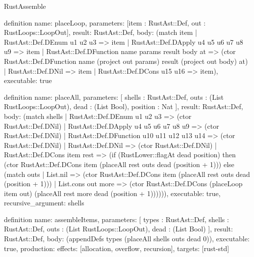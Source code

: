 \begin{lexlean}{RustAssemble}
\begin{semanticmodule}
definition{
  name: placeLoop,
  parameters: [item : RustAst::Def, out : RustLoops::LoopOut],
  result: RustAst::Def,
  body: (match item
    | RustAst::Def.DEnum u1 u2 u3 => item
    | RustAst::Def.DApply u4 u5 u6 u7 u8 u9 => item
    | RustAst::Def.DFunction name params result body at => (ctor RustAst::Def.DFunction name (project out params) result (project out body) at)
    | RustAst::Def.DNil => item
    | RustAst::Def.DCons u15 u16 => item),
  executable: true
}

definition{
  name: placeAll,
  parameters: [
    shells : RustAst::Def,
    outs : (List RustLoops::LoopOut),
    dead : (List Bool),
    position : Nat
  ],
  result: RustAst::Def,
  body: (match shells
    | RustAst::Def.DEnum u1 u2 u3 => (ctor RustAst::Def.DNil)
    | RustAst::Def.DApply u4 u5 u6 u7 u8 u9 => (ctor RustAst::Def.DNil)
    | RustAst::Def.DFunction u10 u11 u12 u13 u14 => (ctor RustAst::Def.DNil)
    | RustAst::Def.DNil => (ctor RustAst::Def.DNil)
    | RustAst::Def.DCons item rest => (if (RustLower::flagAt dead position) then (ctor RustAst::Def.DCons item (placeAll rest outs dead (position + 1))) else (match outs
      | List.nil => (ctor RustAst::Def.DCons item (placeAll rest outs dead (position + 1)))
      | List.cons out more => (ctor RustAst::Def.DCons (placeLoop item out) (placeAll rest more dead (position + 1)))))),
  executable: true,
  recursive_argument: shells
}

definition{
  name: assembleItems,
  parameters: [
    types : RustAst::Def,
    shells : RustAst::Def,
    outs : (List RustLoops::LoopOut),
    dead : (List Bool)
  ],
  result: RustAst::Def,
  body: (appendDefs types (placeAll shells outs dead 0)),
  executable: true,
  production: {effects: [allocation, overflow, recursion], targets: [rust-std]}
}
\end{semanticmodule}
\end{lexlean}
